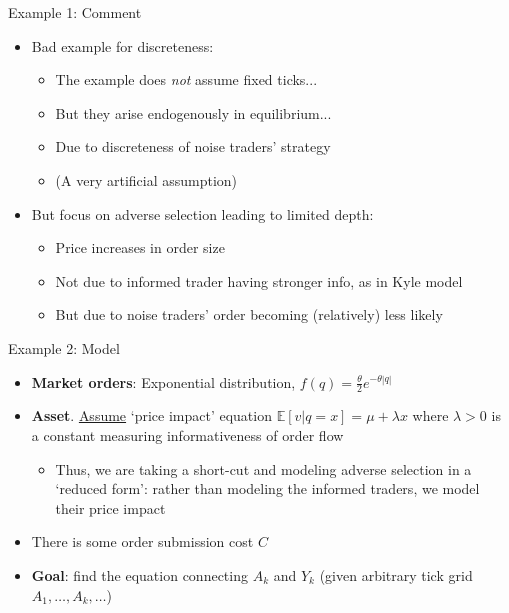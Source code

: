 \documentclass[english,10pt
,aspectratio=169
]{beamer}
\begin{document}
\begin{frame}{Example 1: Comment}
	\begin{itemize}
		\item Bad example for discreteness:
		\begin{itemize}
			\item The example does \emph{not} assume fixed ticks...
			\item But they arise endogenously in equilibrium...
			\item Due to discreteness of noise traders' strategy
			\item (A very artificial assumption)
		\end{itemize}
		\pause
		\item But focus on adverse selection leading to limited depth:
		\begin{itemize}
			\item Price increases in order size
			\item Not due to informed trader having stronger info, as in Kyle model
			\item But due to noise traders' order becoming (relatively) less likely
		\end{itemize}
	\end{itemize}
\end{frame}


\begin{frame}{Example 2: Model}
	\begin{itemize}
		\item \textbf{Market orders}: Exponential distribution, $f(q)=\frac{\theta}{2} e^{-\theta|q|}$
		\item \textbf{Asset}. \underline{Assume} `price impact' equation $\mathbb{E}[v|q=x] = \mu + \lambda x$ where $\lambda >0$ is a constant measuring informativeness of order flow
		\begin{itemize}
			\item Thus, we are taking a short-cut and modeling adverse selection in a `reduced form': rather than modeling the informed traders, we model their price impact
		\end{itemize}
		\item There is some order submission cost $C$
		\item \textbf{Goal}: find the equation connecting $A_k$ and $Y_k$ (given arbitrary tick grid $A_1,\dots,A_k,\dots$)
	\end{itemize}
\end{frame}
\end{document}

